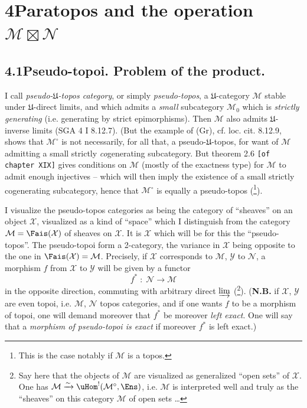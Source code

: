 

\section*{4\quad Paratopos and the operation $\mathcal{M}\boxtimes\mathcal{N}$}

\subsection*{4.1\quad Pseudo-topoi. Problem of the product.}

I call \textit{pseudo-$\mathfrak{U}$-topos category}, or simply \textit{pseudo-topos}, a $\mathfrak{U}$-category $\mathcal{M}$ stable under $\mathfrak{U}$-direct limits, and which admits a \textit{small} subcategory $\mathcal{M}_0$ which is \textit{strictly generating} (i.e. generating by strict epimorphisms). Then $\mathcal{M}$ also admits $\mathfrak{U}$-inverse limits (SGA 4 I 8.12.7). (But the example of (Gr), cf. loc. cit. 8.12.9, shows that $\mathcal{M}^\circ$ is not necessarily, for all that, a pseudo-$\mathfrak{U}$-topos, for want of $\mathcal{M}$ admitting a small strictly \textit{co}generating subcategory. But theorem 2.6 \texttt{[of chapter XIX]} gives conditions on $\mathcal{M}$ (mostly of the exactness type) %
for $\mathcal{M}$ to admit enough injectives -- which will then imply the existence of a small strictly cogenerating subcategory, hence that $\mathcal{M}^\circ$ is equally a pseudo-topos (\footnote{This is the case notably if $\mathcal{M}$ is a topos.}).

I visualize the pseudo-topos categories as being the category of ``sheaves'' on an object $\mathcal{X}$, visualized as a kind of ``space'' which I distinguish from the category $\mathcal{M}=\Fais(\mathcal{X})$ of sheaves on $\mathcal{X}$. It is $\mathcal{X}$ which will be for this the ``pseudo-topos''. The pseudo-topoi form a 2-category, the variance in $\mathcal{X}$ being opposite to the one in $\Fais(\mathcal{X})=\mathcal{M}$. Precisely, if $\mathcal{X}$ corresponds to $\mathcal{M}$, $\mathcal{Y}$ to $\mathcal{N}$, a morphism $f$ from $\mathcal{X}$ to $\mathcal{Y}$ will be given by a functor
\[
f^* \;:\; \mathcal{N} \longrightarrow \mathcal{M}
\tag*{(4.1.1)}
\]
in the opposite direction, commuting with arbitrary direct $\varinjlim$ (\footnote{Say here that the objects of $\mathcal{M}$ are visualized as generalized ``open sets'' of $\mathcal{X}$. One has $\mathcal{M}\xrightarrow{\sim}\uHom^!(\mathcal{M}^\circ,\Ens)$, i.e. $\mathcal{M}$ is interpreted well and truly as the ``sheaves'' on this category $\mathcal{M}$ of open sets \ldots}). (\textbf{N.B.} if $\mathcal{X}$, $\mathcal{Y}$ are even topoi, i.e. $\mathcal{M}$, $\mathcal{N}$ topos categories, and if one wants $f$ to be a morphism of topoi, one will demand moreover that $f^*$ be moreover \textit{left exact}. One will say that a \textit{morphism of pseudo-topoi is exact} if moreover $f^*$ is left exact.)

